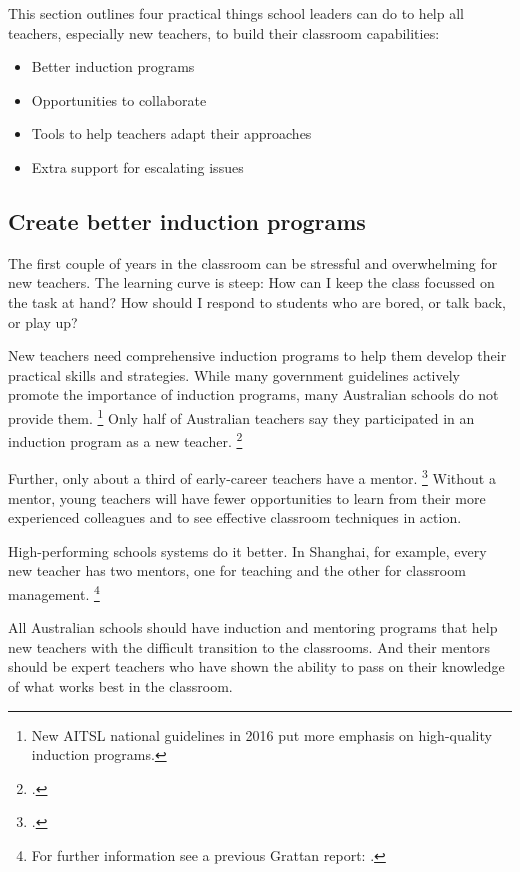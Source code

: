 \documentclass[FrontPage]{grattan}
\begin{document}
This section outlines four practical things school leaders can do to help all teachers, especially new teachers, to build their classroom capabilities:
 
\begin{itemize}
    \item Better induction programs
    \item Opportunities to collaborate
    \item Tools to help teachers adapt their approaches
    \item Extra support for escalating issues
\end{itemize}

\subsection{Create better induction programs}\label{subsubsec:create-better-induction-programs}
The first couple of years in the classroom can be stressful and overwhelming for new teachers. The learning curve is steep: How can I keep the class focussed on the task at hand? How should I respond to students who are bored, or talk back, or play up?

New teachers need comprehensive induction programs to help them develop their practical skills and strategies. While many government guidelines actively promote the importance of induction programs, many Australian schools do not provide them.%
  \footnote{New AITSL national guidelines in 2016 put more emphasis on high-quality induction programs.} 
Only half of Australian teachers say they participated in an induction program as a new teacher.%
    \footcite[][Table 4.1]{OECD2014TALIS2013ResultsTeachingLearning}
    
Further, only about a third of early-career teachers have a mentor.%
   \footcite[][Table 4.4]{OECD2014TALIS2013ResultsTeachingLearning}
Without a mentor, young teachers will have fewer opportunities to learn from their more experienced colleagues and to see effective classroom techniques in action. 
 
High-performing schools systems do it better. In Shanghai, for example, every new teacher has two mentors, one for teaching and the other for classroom management.%
    \footnote{For further information see a previous Grattan report: \textcite{Jensen-2012-Catching-up-learning-from-best-in-East-Asia}.}

All Australian schools should have induction and mentoring programs that help new teachers with the difficult transition to the classrooms. And their mentors should be expert teachers who have shown the ability to pass on their knowledge of what works best in the classroom.
\end{document}
